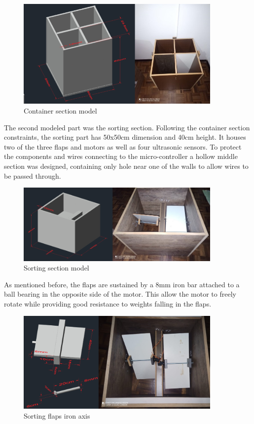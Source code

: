\documentclass[a4paper,11pt]{article}
\begin{document}
\begin{figure}[H]
  \centering
  \includegraphics[width=10cm]{Figures/Container Block.png}
  \caption{\small{Container section model}}
  \label{fig:containerModel}
\end{figure}

The second modeled part was the sorting section. Following the container section constraints, the sorting part has 50x50cm dimension and 40cm height. It houses two of the three flaps and motors as well as four ultrasonic sensors. To protect the components and wires connecting to the micro-controller a hollow middle section was designed, containing only hole near one of the walls to allow wires to be passed through.

\begin{figure}[H]
  \centering
  \includegraphics[width=10cm]{Figures/Sorting1.png}
  \caption{\small{Sorting section model}}
  \label{fig:sortingModel1}
\end{figure}

As mentioned before, the flaps are sustained by a 8mm iron bar attached to a ball bearing in the opposite side of the motor. This allow the motor to freely rotate while providing good resistance to weights falling in the flaps.

\begin{figure}[H]
  \centering
  \includegraphics[width=10cm]{Figures/Sorting2.png}
  \caption{\small{Sorting flaps iron axis}}
  \label{fig:sortingModel2}
\end{figure}
\end{document}
